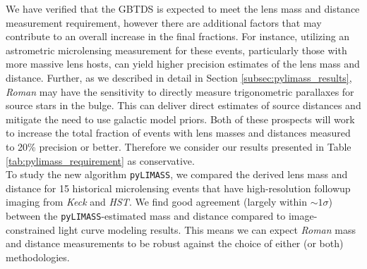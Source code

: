 \documentclass[twocolumn]{aastex631}
\begin{document}
\indent We have verified that the GBTDS is expected to meet the lens mass and distance measurement requirement, however there are additional factors that may contribute to an overall increase in the final fractions. For instance, utilizing an astrometric microlensing measurement for these events, particularly those with more massive lens hosts, can yield higher precision estimates of the lens mass and distance. Further, as we described in detail in Section \ref{subsec:pylimass_results}, \textit{Roman} may have the sensitivity to directly measure trigonometric parallaxes for source stars in the bulge. This can deliver direct estimates of source distances and mitigate the need to use galactic model priors. Both of these prospects will work to increase the total fraction of events with lens masses and distances measured to 20\% precision or better. Therefore we consider our results presented in Table \ref{tab:pylimass_requirement} as conservative. \\
\indent To study the new algorithm \texttt{pyLIMASS}, we compared the derived lens mass and distance for 15 historical microlensing events that have high-resolution followup imaging from \textit{Keck} and \textit{HST}. We find good agreement (largely within ${\sim}1\sigma$) between the \texttt{pyLIMASS}-estimated mass and distance compared to image-constrained light curve modeling results. This means we can expect \textit{Roman} mass and distance measurements to be robust against the choice of either (or both) methodologies.
\end{document}
